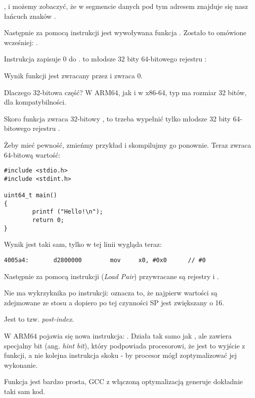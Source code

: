 , i możemy zobaczyć, że w segmencie danych  pod tym adresem znajduje się nasz
łańcuch znaków .

Następnie za pomocą instrukcji  jest wywoływana funkcja \puts. Zostało to omówione wcześniej: .

Instrukcja \MOV zapisuje 0 do . 
 to młodsze 32 bity 64-bitowego rejestru :



Wynik funkcji jest zwracany przez  i \main zwraca 0.

Dlaczego 32-bitowa część?
W ARM64, jak i w x86-64, typ \Tint ma rozmiar 32 bitów, dla kompatybilności.

Skoro funkcja zwraca 32-bitowy \Tint, to trzeba wypełnić tylko młodsze 32 bity 64-bitowego rejestru .

Żeby mieć pewność, zmieńmy przykład i skompilujmy go ponownie.
Teraz \main zwraca 64-bitową wartość:

\begin{lstlisting}[caption=funkcja \main zwracająca wartość typu \TT{uint64\_t},style=customc]
#include <stdio.h>
#include <stdint.h>

uint64_t main()
{
        printf ("Hello!\n");
        return 0;
}
\end{lstlisting}

Wynik jest taki sam, tylko \MOV w tej linii wygląda teraz:

\begin{lstlisting}[caption=\NonOptimizing GCC 4.8.1 + objdump]
  4005a4:       d2800000        mov     x0, #0x0      // #0
\end{lstlisting}

Następnie za pomocą instrukcji  (\emph{Load Pair}) przywracane są rejestry  i .

Nie ma wykrzyknika po instrukcji: oznacza to, że najpierw wartości są zdejmowane ze stosu a dopiero po tej czynności \ac{SP} jest zwiększany o 16.

Jest to tzw. \emph{post-index}.

W ARM64 pojawia się nowa instrukcja: \RET. 
Działa tak samo jak , ale zawiera specjalny bit (ang. \emph{hint bit}),
który podpowiada procesorowi, że jest to wyjście z funkcji, a nie kolejna instrukcja skoku - by procesor mógł zoptymalizować jej wykonanie.

Funkcja jest bardzo prosta, GCC z włączoną optymalizacją generuje dokładnie taki sam kod.


